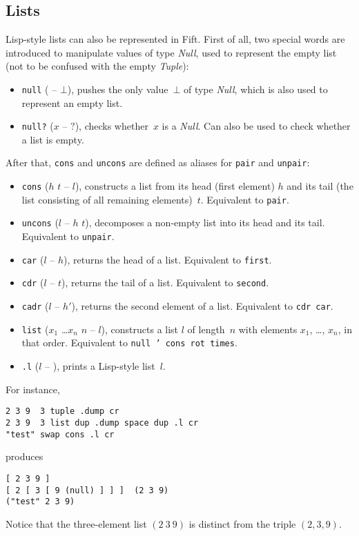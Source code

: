 \documentclass[12pt,oneside]{article}
\def\mysubsection#1{\subsection{#1}\fancyhead[C]{\small{\textsc{\textrm{\thesubsection.} #1}}}}
\begin{document}
\mysubsection{Lists}\label{p:lists}
Lisp-style lists can also be represented in Fift. First of all, two special words are introduced to manipulate values of type {\em Null}, used to represent the empty list (not to be confused with the empty {\em Tuple}):
\begin{itemize}
\item {\tt null} ( -- $\bot$), pushes the only value~$\bot$ of type {\em Null}, which is also used to represent an empty list.
\item {\tt null?} ($x$ -- $?$), checks whether~$x$ is a {\em Null}. Can also be used to check whether a list is empty.
\end{itemize}
After that, {\tt cons} and {\tt uncons} are defined as aliases for {\tt pair} and {\tt unpair}:
\begin{itemize}
\item {\tt cons} ($h$ $t$ -- $l$), constructs a list from its head (first element) $h$ and its tail (the list consisting of all remaining elements)~$t$. Equivalent to {\tt pair}.
\item {\tt uncons} ($l$ -- $h$ $t$), decomposes a non-empty list into its head and its tail. Equivalent to {\tt unpair}.
\item {\tt car} ($l$ -- $h$), returns the head of a list. Equivalent to {\tt first}.
\item {\tt cdr} ($l$ -- $t$), returns the tail of a list. Equivalent to {\tt second}.
\item {\tt cadr} ($l$ -- $h'$), returns the second element of a list. Equivalent to {\tt cdr car}.
\item {\tt list} ($x_1$ \dots $x_n$ $n$ -- $l$), constructs a list $l$ of length~$n$ with elements $x_1$, \ldots, $x_n$, in that order. Equivalent to {\tt null ' cons rot times}.
\item {\tt .l} ($l$ -- ), prints a Lisp-style list~$l$.
\end{itemize}
For instance,
\begin{verbatim}
2 3 9  3 tuple .dump cr
2 3 9  3 list dup .dump space dup .l cr 
"test" swap cons .l cr
\end{verbatim}
produces
\begin{verbatim}
[ 2 3 9 ] 
[ 2 [ 3 [ 9 (null) ] ] ]  (2 3 9) 
("test" 2 3 9) 
\end{verbatim}
Notice that the three-element list $(2\ 3\ 9)$ is distinct from the triple $(2,3,9)$.
\end{document}
